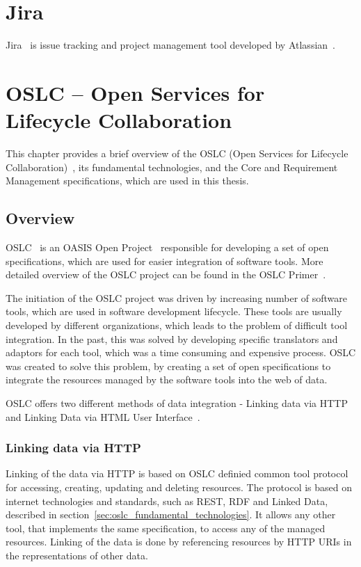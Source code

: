 
\chapter{Jira}
Jira \cite{jira} is issue tracking and project management tool developed by Atlassian \cite{atlassian}.


\chapter{OSLC -- Open Services for Lifecycle Collaboration}
This chapter provides a brief overview of the OSLC (Open Services for Lifecycle Collaboration) \cite{oslc}, its fundamental technologies, and the Core and Requirement Management specifications, which are used in this thesis.

\section{Overview}
OSLC \cite{oslc} is an OASIS Open Project \cite{oasis_open} responsible for developing a set of open specifications, which are used for easier integration of software tools. More detailed overview of the OSLC project can be found in the OSLC Primer \cite{oslc_primer}.

The initiation of the OSLC project was driven by increasing number of software tools, which are used in software development lifecycle. These tools are usually developed by different organizations, which leads to the problem of difficult tool integration. In the past, this was solved by developing specific translators and adaptors for each tool, which was a time consuming and expensive process. OSLC was created to solve this problem, by creating a set of open specifications to integrate the resources managed by the software tools into the web of data.

OSLC offers two different methods of data integration - Linking data via HTTP and Linking Data via HTML User Interface \cite{oslc_primary_integration_techniques}.

\subsection*{Linking data via HTTP}
Linking of the data via HTTP is based on OSLC definied common tool protocol for accessing, creating, updating and deleting resources. The protocol is based on internet technologies and standards, such as REST, RDF and Linked Data, described in section \ref{sec:oslc_fundamental_technologies}. It allows any other tool, that implements the same specification, to access any of the managed resources. Linking of the data is done by referencing resources by HTTP URIs in the representations of other data.

